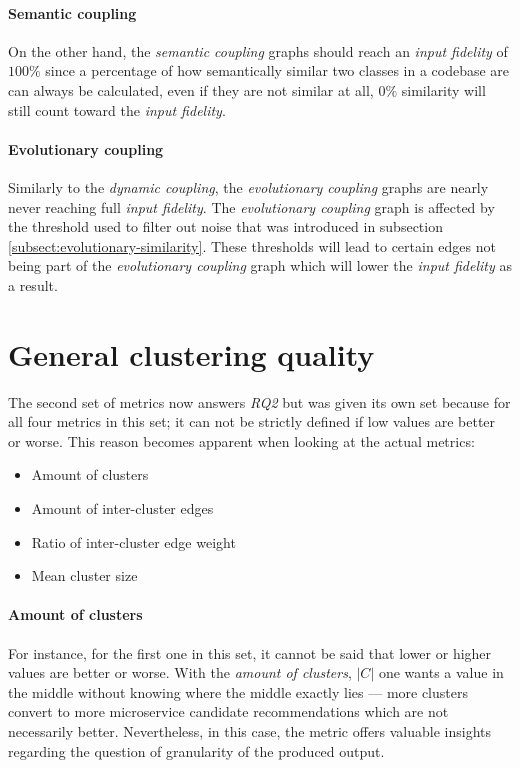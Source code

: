 \documentclass[12pt,a4paper]{report}
\begin{document}
\paragraph{Semantic coupling}
On the other hand, the \textit{semantic coupling}
graphs should reach an \textit{input fidelity} of \(100\%\) since a percentage
of how semantically similar two classes in a codebase are can always be
calculated, even if they are not similar at all, \(0\%\) similarity will still
count toward the \textit{input fidelity}.

\paragraph{Evolutionary coupling}
Similarly to the \textit{dynamic coupling},
the \textit{evolutionary coupling} graphs are nearly never reaching full
\textit{input fidelity}. The \textit{evolutionary coupling} graph is affected
by the threshold used to filter out noise that was introduced in subsection
\ref{subsect:evolutionary-similarity}. These thresholds will lead to certain
edges not being part of the \textit{evolutionary coupling} graph which will
lower the \textit{input fidelity} as a result.



\section{General clustering quality}

The second set of metrics now answers \textit{RQ2} but was given its own set
because for all four metrics in this set; it can not be strictly defined if low
values are better or worse. This reason becomes apparent when looking at the
actual metrics:
\begin{itemize}[noitemsep]
  \item Amount of clusters
  \item Amount of inter-cluster edges
  \item Ratio of inter-cluster edge weight
  \item Mean cluster size
\end{itemize}

\paragraph{Amount of clusters}
For instance, for the first one in this set, it
cannot be said that lower or higher values are better or worse. With the
\textit{amount of clusters}, \(\vert C \vert\) one wants a value in the middle
without knowing where the middle exactly lies --- more clusters convert to more
microservice candidate recommendations which are not necessarily better.
Nevertheless, in this case, the metric offers valuable insights regarding the
question of granularity of the produced output.
\end{document}
